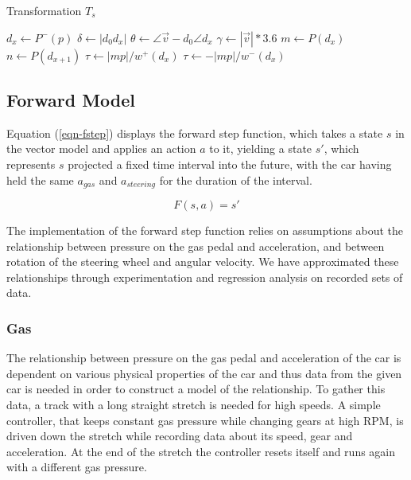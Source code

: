 \documentclass[conference]{IEEEtran}
\begin{document}
\begin{algorithm}
\caption{Transformation $T_s$}
\label{alg-ts}
\begin{algorithmic}[1]
\State $d_x \gets P^-(p)$ 
\State $\delta \gets |d_0 d_x|$ \label{line-ass-delta}
\State $\theta \gets \angle\vec{v} - d_0 \angle d_x$ \label{line-ass-theta}
\State $\gamma \gets |\vec{v}| * 3.6$ \label{line-ass-gamma} 
\State $m \gets P(d_x)$
\State $n \gets P(d_{x+1})$
  \label{line-det}
	\State $\tau \gets |mp| / w^+(d_x)$ \label{line-ass-tau1}
\Else
	\State $\tau \gets -|mp| / w^-(d_x)$ \label{line-ass-tau2}
\EndIf
\end{algorithmic}
\end{algorithm}

\subsection{Forward Model}

Equation (\ref{eqn-fstep}) displays the forward step function, which takes a state $s$ in the vector model and applies an action $a$ to it, yielding a state $s'$, which represents $s$ projected a fixed time interval into the future, with the car having held the same $a_{gas}$ and $a_{steering}$ for the duration of the interval.

\begin{equation}
\label{eqn-fstep}
F(s,a)=s'
\end{equation}

The implementation of the forward step function relies on assumptions about the relationship between pressure on the gas pedal and acceleration, and between rotation of the steering wheel and angular velocity. We have approximated these relationships through experimentation and regression analysis on recorded sets of data.

\subsubsection{Gas}
The relationship between pressure on the gas pedal and acceleration of the car is dependent on various physical properties of the car and thus data from the given car is needed in order to construct a model of the relationship. To gather this data, a track with a long straight stretch is needed for high speeds. A simple controller, that keeps constant gas pressure while changing gears at high RPM, is driven down the stretch while recording data about its speed, gear and acceleration. At the end of the stretch the controller resets itself and runs again with a different gas pressure.
\end{document}
